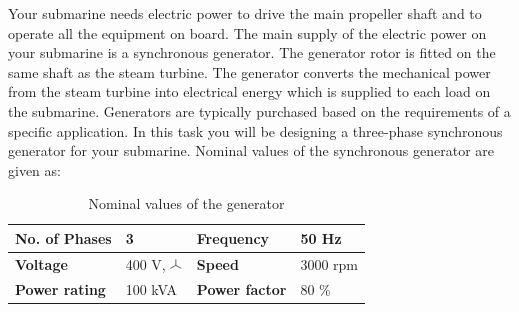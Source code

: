 \documentclass{article}
\newcommand{\wye}{\mathbin{\tikz[x=1ex,y=1ex]{\draw[line width=.1ex] (0,0)--(30:1)--++(-30:1) (30:1)--++(0,1);}}}
\begin{document}
Your submarine needs electric power to drive the main propeller shaft and to operate all the equipment on board. The main supply of the electric power on your submarine is a synchronous generator. The generator rotor is fitted on the same shaft as the steam turbine. The generator converts the mechanical power from the steam turbine into electrical energy which is supplied to each load on the submarine. Generators are typically purchased based on the requirements of a specific application. In this task you will be designing a three-phase synchronous generator for your submarine. Nominal values of the synchronous generator are given as: 
\begin{table}[h!]
    \caption{Nominal values of the generator}
    \label{tab:nominalValues}
    \begin{tabularx}{\textwidth}{|Y|Y|Y|Y|} \hline
    \textbf{No. of Phases} & 3 & \textbf{Frequency} & 50 Hz \\ \hline \textbf{Voltage} & 400 V, {\Large $\wye$} & \textbf{Speed} & 3000 rpm \\ \hline
    \textbf{Power rating} & 100 kVA & \textbf{Power factor} & 80 \% \\ \hline
    \end{tabularx}
\end{table}
\end{document}
